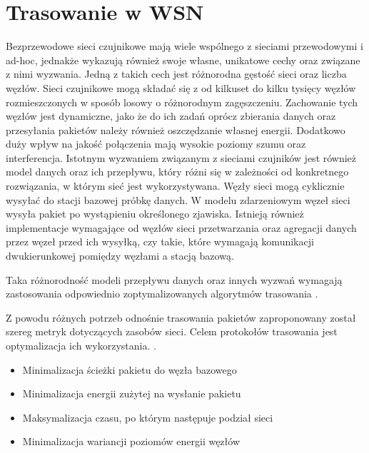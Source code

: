 \section{Trasowanie w WSN} \label{routing}
Bezprzewodowe sieci czujnikowe mają wiele wspólnego z sieciami przewodowymi i ad-hoc, jednakże wykazują również swoje własne, unikatowe cechy oraz związane z nimi wyzwania.
Jedną z takich cech jest różnorodna gęstość sieci oraz liczba węzłów. Sieci czujnikowe mogą składać się z od kilkuset do kilku tysięcy węzłów rozmieszczonych w sposób losowy o różnorodnym zagęszczeniu. Zachowanie tych węzłów jest dynamiczne, jako że do ich zadań oprócz zbierania danych oraz przesyłania pakietów należy również oszczędzanie własnej energii. Dodatkowo duży wpływ na jakość połączenia mają wysokie poziomy szumu oraz interferencja.
Istotnym wyzwaniem związanym z sieciami czujników jest również model danych oraz ich przepływu, który różni się w zależności od konkretnego rozwiązania, w którym sieć jest wykorzystywana. Węzły sieci mogą cyklicznie wysyłać do stacji bazowej próbkę danych. W modelu zdarzeniowym węzeł sieci wysyła pakiet po wystąpieniu określonego zjawiska. Istnieją również implementacje wymagające od węzłów sieci przetwarzania oraz agregacji danych przez węzeł przed ich wysyłką, czy takie, które wymagają komunikacji dwukierunkowej pomiędzy węzłami a stacją bazową.


Taka różnorodność modeli przepływu danych oraz innych wyzwań wymagają zastosowania odpowiednio zoptymalizowanych algorytmów trasowania \cite{Abdullah2014, Sohraby2006}.

Z powodu różnych potrzeb odnośnie trasowania pakietów zaproponowany został szereg metryk dotyczących zasobów sieci. Celem protokołów trasowania jest optymalizacja ich wykorzystania. \cite{Dargie2010, Biradar2009}.
\begin{itemize}
 \item Minimalizacja ścieżki pakietu do węzła bazowego
 \item Minimalizacja energii zużytej na wysłanie pakietu
 \item Maksymalizacja czasu, po którym następuje podział sieci
 \item Minimalizacja wariancji poziomów energii węzłów
\end{itemize}

